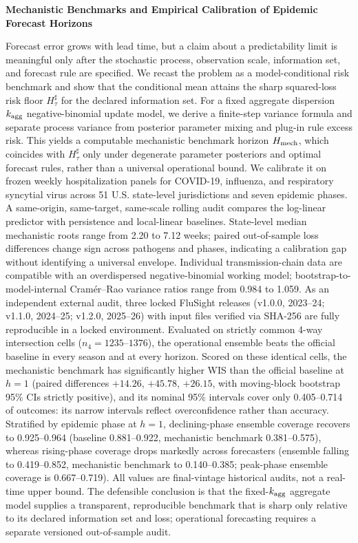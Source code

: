 \documentclass[11pt,a4paper]{article}
\begin{document}
\vspace{1.2em}
\begin{center}
{\Large\bfseries Mechanistic Benchmarks and Empirical Calibration of Epidemic Forecast Horizons}
\end{center}
 Forecast error grows with lead time, but a claim about a predictability limit is meaningful only after the stochastic process, observation scale, information set, and forecast rule are specified. We recast the problem as a model-conditional risk benchmark and show that the conditional mean attains the sharp squared-loss risk floor $H_\tau^\sharp$ for the declared information set. For a fixed aggregate dispersion $k_{\rm agg}$ negative-binomial update model, we derive a finite-step variance formula and separate process variance from posterior parameter mixing and plug-in rule excess risk. This yields a computable mechanistic benchmark horizon $H_{\rm mech}$, which coincides with $H_\tau^\sharp$ only under degenerate parameter posteriors and optimal forecast rules, rather than a universal operational bound. We calibrate it on frozen weekly hospitalization panels for COVID-19, influenza, and respiratory syncytial virus across 51 U.S. state-level jurisdictions and seven epidemic phases. A same-origin, same-target, same-scale rolling audit compares the log-linear predictor with persistence and local-linear baselines. State-level median mechanistic roots range from 2.20 to 7.12 weeks; paired out-of-sample loss differences change sign across pathogens and phases, indicating a calibration gap without identifying a universal envelope. Individual transmission-chain data are compatible with an overdispersed negative-binomial working model; bootstrap-to-model-internal Cramér--Rao variance ratios range from 0.984 to 1.059. As an independent external audit, three locked FluSight releases (v1.0.0, 2023--24; v1.1.0, 2024--25; v1.2.0, 2025--26) with input files verified via SHA-256 are fully reproducible in a locked environment. Evaluated on strictly common 4-way intersection cells ($n_4=1235$--$1376$), the operational ensemble beats the official baseline in every season and at every horizon. Scored on these identical cells, the mechanistic benchmark has significantly higher WIS than the official baseline at $h=1$ (paired differences $+14.26$, $+45.78$, $+26.15$, with moving-block bootstrap 95\% CIs strictly positive), and its nominal 95\% intervals cover only 0.405--0.714 of outcomes: its narrow intervals reflect overconfidence rather than accuracy. Stratified by epidemic phase at $h=1$, declining-phase ensemble coverage recovers to 0.925--0.964 (baseline 0.881--0.922, mechanistic benchmark 0.381--0.575), whereas rising-phase coverage drops markedly across forecasters (ensemble falling to 0.419--0.852, mechanistic benchmark to 0.140--0.385; peak-phase ensemble coverage is 0.667--0.719). All values are final-vintage historical audits, not a real-time upper bound. The defensible conclusion is that the fixed-$k_{\rm agg}$ aggregate model supplies a transparent, reproducible benchmark that is sharp only relative to its declared information set and loss; operational forecasting requires a separate versioned out-of-sample audit.
\end{document}
